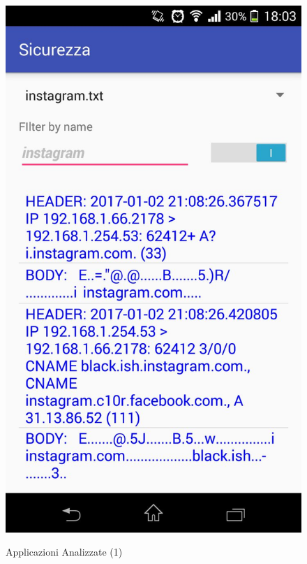 \documentclass[12pt]{article} %
\begin{document}
\begin{figure}[htbp]
{\includegraphics[scale=0.25]{./instagram.jpeg}}
\caption{Applicazioni Analizzate (1)\label{fig:app1}}
\end{figure} 
\end{document}
